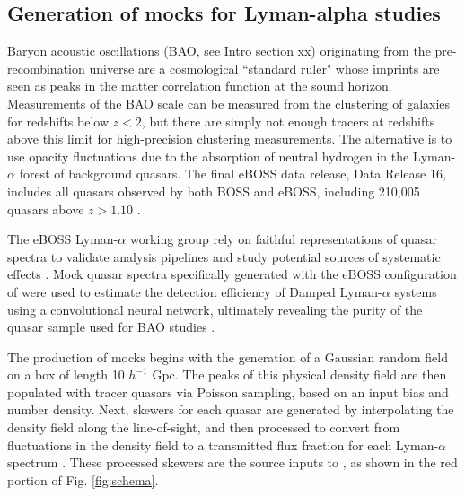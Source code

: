 \subsection{Generation of mocks for Lyman-alpha studies}


Baryon acoustic oscillations (BAO, see Intro section xx) originating from the pre-recombination universe are a cosmological ``standard ruler" whose imprints are seen as peaks in the matter correlation function at the sound horizon. Measurements of the BAO scale can be measured from the clustering of galaxies for redshifts below $z<2$, but there are simply not enough tracers at redshifts above this limit for high-precision clustering measurements. The alternative is to use opacity fluctuations due to the absorption of neutral hydrogen in the Lyman-$\alpha$ forest of background quasars. The final eBOSS data release, Data Release 16, includes all quasars observed by both BOSS and eBOSS, including 210,005 quasars above $z>1.10$ \cite{dMdB20}.

The eBOSS Lyman-$\alpha$ working group rely on faithful representations of quasar spectra to validate analysis pipelines and study potential sources of systematic effects \cite{Farr20}. Mock quasar spectra specifically generated with the eBOSS configuration of  were used to estimate the detection efficiency of Damped Lyman-$\alpha$ systems using a convolutional neural network, ultimately revealing the purity of the quasar sample used for BAO studies \cite{Chabanier21}. 

The production of mocks begins with the generation of a Gaussian random field on a box of length 10 $h^{-1}$ Gpc. The peaks of this physical density field are then populated with tracer quasars via Poisson sampling, based on an input bias and number density. Next, skewers for each quasar are generated by interpolating the density field along the line-of-sight, and then processed to convert from fluctuations in the density field to a transmitted flux fraction for each Lyman-$\alpha$ spectrum \cite{dMdB20}. These processed skewers are the source inputs to , as shown in the red portion of Fig. \ref{fig:schema}.


